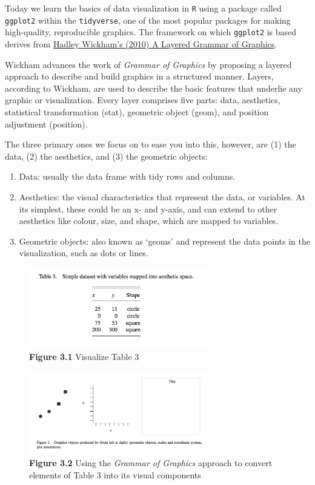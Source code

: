 \documentclass[
]{book}
\begin{document}
Today we learn the basics of data visualization in \texttt{R} using a package called \texttt{ggplot2} within the \texttt{tidyverse}, one of the most popular packages for making high-quality, reproducible graphics. The framework on which \texttt{ggplot2} is based derives from \href{http://vita.had.co.nz/papers/layered-grammar.pdf}{Hadley Wickham's (2010) A Layered Grammar of Graphics}.

Wickham advances the work of \emph{Grammar of Graphics} by proposing a layered approach to describe and build graphics in a structured manner. Layers, according to Wickham, are used to describe the basic features that underlie any graphic or visualization. Every layer comprises five parts: data, aesthetics, statistical transformation (stat), geometric object (geom), and position adjustment (position).

The three primary ones we focus on to ease you into this, however, are (1) the data, (2) the aesthetics, and (3) the geometric objects:

\begin{enumerate}
\def\labelenumi{\arabic{enumi}.}
\item
  Data: usually the data frame with tidy rows and columns.
\item
  Aesthetics: the visual characteristics that represent the data, or variables. At its simplest, these could be an x- and y-axis, and can extend to other aesthetics like colour, size, and shape, which are mapped to variables.
\item
  Geometric objects: also known as `geoms' and represent the data points in the visualization, such as dots or lines.
\end{enumerate}

\begin{figure}
\centering
\includegraphics[width=0.7\textwidth,height=\textheight]{Images/grammar1.png}
\caption{\textbf{Figure 3.1} Visualize Table 3}
\end{figure}

\begin{figure}
\centering
\includegraphics[width=0.7\textwidth,height=\textheight]{Images/grammar 2.png}
\caption{\textbf{Figure 3.2} Using the \emph{Grammar of Graphics} approach to convert elements of Table 3 into its visual components}
\end{figure}
\end{document}
